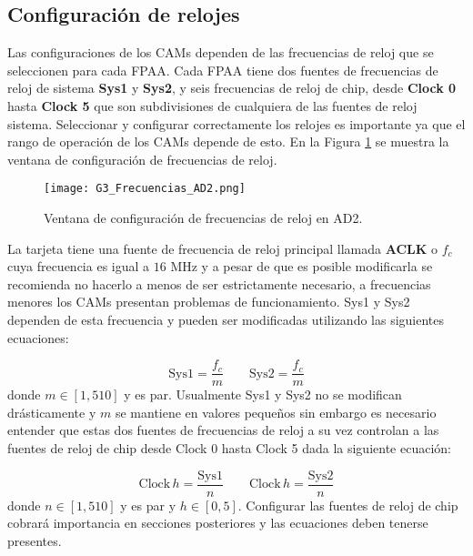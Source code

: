 		\subsection{Configuración de relojes}
	
	Las configuraciones de los CAMs dependen de las frecuencias de reloj que se seleccionen para cada FPAA. Cada FPAA tiene dos fuentes de frecuencias de reloj de sistema \textbf{Sys1} y \textbf{Sys2}, y seis frecuencias de reloj de chip, desde \textbf{Clock 0} hasta \textbf{Clock 5} que son subdivisiones de cualquiera de las fuentes de reloj sistema. Seleccionar y configurar correctamente los relojes es importante ya que el rango de operación de los CAMs depende de esto.  En la Figura \ref{fig:G3_Frecuencias_AD2} se muestra la ventana de configuración de frecuencias de reloj.
	
	\begin{figure}[!ht] 
		\caption{Ventana de configuración de frecuencias de reloj en AD2.}
		\label{fig:G3_Frecuencias_AD2}
		\centering
		\texttt{[image: G3\_Frecuencias\_AD2.png]}
	\end{figure}

	La tarjeta tiene una fuente de frecuencia de reloj principal llamada \textbf{ACLK} o $f_{c}$ cuya frecuencia es igual a $16$ MHz y a pesar de que es posible modificarla se recomienda no hacerlo a menos de ser estrictamente necesario, a frecuencias menores los CAMs presentan problemas de funcionamiento. Sys1 y Sys2 dependen de esta frecuencia y pueden ser modificadas utilizando las siguientes ecuaciones:

	\begin{equation}
		\mathrm{Sys1} = \frac{f_{c}}{m} \qquad \mathrm{Sys2} = \frac{f_{c}}{m}
		\label{ec:sys_clock}
	\end{equation}
	donde $m\in [1,510]$ y es par. Usualmente Sys1 y Sys2 no se modifican drásticamente y $m$ se mantiene en valores pequeños sin embargo es necesario entender que estas dos fuentes de frecuencias de reloj a su vez controlan a las fuentes de reloj de chip desde Clock 0 hasta Clock 5 dada la siguiente ecuación:

	\begin{equation}
		\mathrm{Clock\,} h = \frac{\mathrm{Sys1}}{n}	\qquad   \mathrm{Clock\,} h = \frac{\mathrm{Sys2}}{n}
		\label{ec:clock_h}
	\end{equation}
	donde $n\in[1,510]$ y es par y $h\in[0,5]$. Configurar las fuentes de reloj de chip cobrará importancia en secciones posteriores y las ecuaciones deben tenerse presentes.

